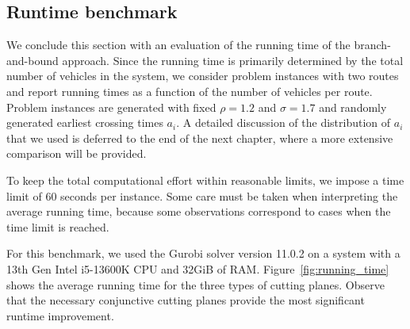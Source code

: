 \documentclass[a4paper]{report}
\theoremstyle{definition}
\theoremstyle{plain}
\newcommand\note[1]{{\color{Navy}\noindent#1}}
\begin{document}
\subsection{Runtime benchmark}\label{sec:runtime-bench}

We conclude this section with an evaluation of the running time of the
branch-and-bound approach.
%
Since the running time is primarily determined by the total number of vehicles
in the system, we consider problem instances with two routes and report
running times as a function of the number of vehicles per route.
%
Problem instances are generated with fixed $\rho=1.2$ and $\sigma=1.7$ and randomly
generated earliest crossing times $a_i$.
%
A detailed discussion of the distribution of $a_i$ that we used is deferred to
the end of the next chapter, where a more extensive comparison will be provided.

To keep the total computational effort within reasonable limits, we impose a
time limit of 60 seconds per instance.
%
Some care must be taken when interpreting the average running time, because some
observations correspond to cases when the time limit is reached.

For this benchmark, we used the Gurobi solver version 11.0.2 on a system with a
13th Gen Intel i5-13600K CPU and 32GiB of RAM.
%
Figure~\ref{fig:running_time} shows the average running time for the three types of cutting planes.
Observe that the necessary conjunctive cutting planes provide the most
significant runtime improvement.

\end{document}
